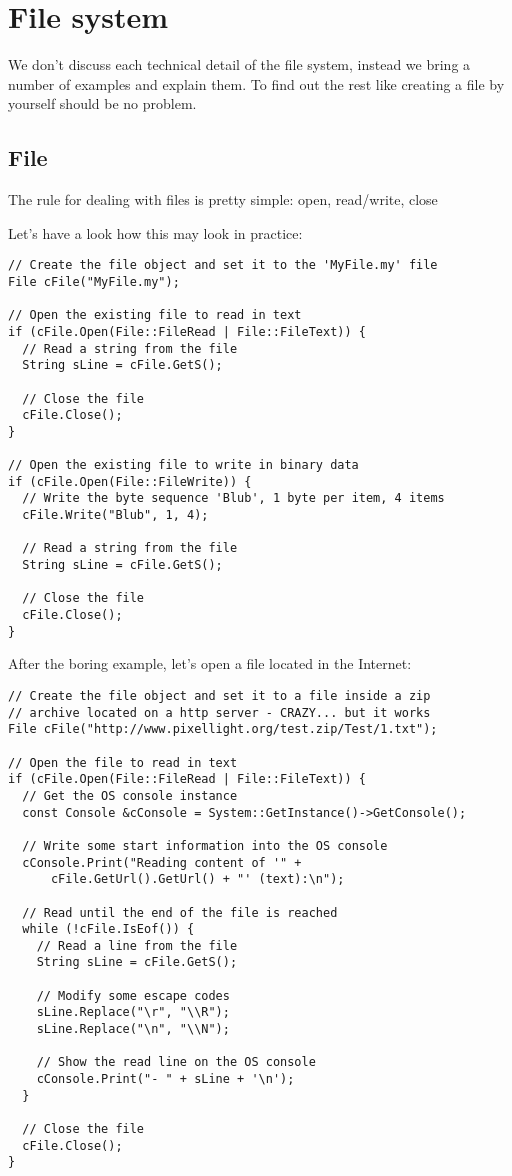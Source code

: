 \section{File system}
We don't discuss each technical detail of the file system, instead we bring a number of examples and explain them. To find out the rest like creating a file by yourself should be no problem.




\subsection{File}
The rule for dealing with files is pretty simple: open, read/write, close

Let's have a look how this may look in practice:

\begin{lstlisting}[caption=File usage example]
// Create the file object and set it to the 'MyFile.my' file
File cFile("MyFile.my");

// Open the existing file to read in text
if (cFile.Open(File::FileRead | File::FileText)) {
  // Read a string from the file
  String sLine = cFile.GetS();

  // Close the file
  cFile.Close();
}

// Open the existing file to write in binary data
if (cFile.Open(File::FileWrite)) {
  // Write the byte sequence 'Blub', 1 byte per item, 4 items
  cFile.Write("Blub", 1, 4);

  // Read a string from the file
  String sLine = cFile.GetS();

  // Close the file
  cFile.Close();
}
\end{lstlisting}

After the boring example, let's open a file located in the Internet:

\begin{lstlisting}[caption=http file usage example]
// Create the file object and set it to a file inside a zip
// archive located on a http server - CRAZY... but it works
File cFile("http://www.pixellight.org/test.zip/Test/1.txt");

// Open the file to read in text
if (cFile.Open(File::FileRead | File::FileText)) {
  // Get the OS console instance
  const Console &cConsole = System::GetInstance()->GetConsole();

  // Write some start information into the OS console
  cConsole.Print("Reading content of '" +
      cFile.GetUrl().GetUrl() + "' (text):\n");

  // Read until the end of the file is reached
  while (!cFile.IsEof()) {
    // Read a line from the file
    String sLine = cFile.GetS();

    // Modify some escape codes
    sLine.Replace("\r", "\\R");
    sLine.Replace("\n", "\\N");

    // Show the read line on the OS console
    cConsole.Print("- " + sLine + '\n');
  }

  // Close the file
  cFile.Close();
}
\end{lstlisting}




